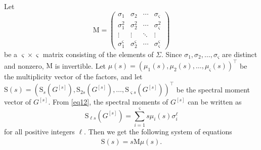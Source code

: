 \documentclass{article}
\begin{document}
Let $$\mathrm{M}=\begin{pmatrix} \sigma_{1} & \sigma_{2} & \cdots & \sigma_{\varsigma} \\ \sigma_{1}^{2} & \sigma_{2}^{2} & \cdots & \sigma_{\varsigma}^{2} \\ \vdots & \vdots & \ddots & \vdots \\ \sigma_{1}^{\varsigma} & \sigma_{2}^{\varsigma} & \cdots & \sigma_{\varsigma}^{\varsigma} \end{pmatrix}$$
be a $\varsigma \times \varsigma$ matrix consisting of the elements of $\Sigma$.
Since $\sigma_{1},\sigma_{2},\ldots,\sigma_{\varsigma}$ are distinct and nonzero,
$\mathrm{M}$ is invertible.
Let $\mu(s)=\left(\mu_{1}(s),\mu_{2}(s),\ldots,\mu_{\varsigma}(s)\right)^{\top}$ be the multiplicity vector of the factors,
and let $\mathrm{S}(s)=\left(\mathrm{S}_{s}(G^{[s]}),\mathrm{S}_{2s}(G^{[s]}),\ldots,\mathrm{S}_{\varsigma s}(G^{[s]})\right)^{\top}$ be the spectral moment vector of $G^{[s]}$.
From \eqref{eq12},
the spectral moments of $G^{[s]}$ can be written as $$\mathrm{S}_{\ell s}(G^{[s]})=\sum_{i=1}^{\varsigma}s\mu_{i}(s)\sigma_{i}^{\ell}$$ for all positive integers $\ell$.
Then we get the following system of equations
\begin{align}\label{eq13}
\mathrm{S}(s)=s\mathrm{M}\mu(s).
\end{align}
\end{document}
